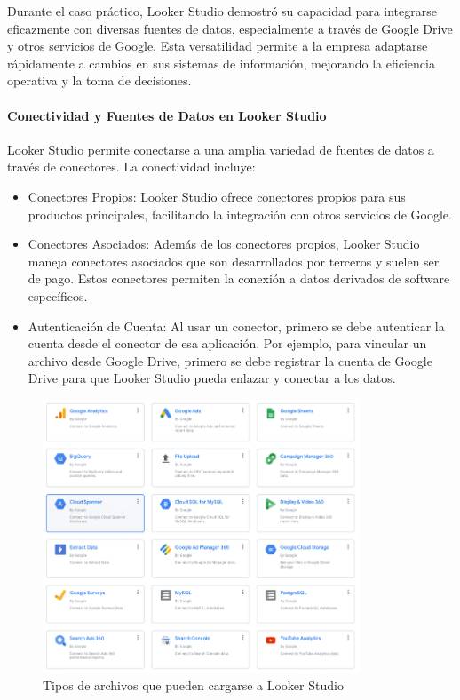 \documentclass[
  11pt,
  bookmarksnumbered]{article}
\begin{document}
Durante el caso práctico, Looker Studio demostró su capacidad para integrarse eficazmente con diversas fuentes de datos, especialmente a través de Google Drive y otros servicios de Google.
Esta versatilidad permite a la empresa adaptarse rápidamente a cambios en sus sistemas de información, mejorando la eficiencia operativa y la toma de decisiones.

\hypertarget{conectividad-y-fuentes-de-datos-en-looker-studio}{%
\paragraph{Conectividad y Fuentes de Datos en Looker Studio}\label{conectividad-y-fuentes-de-datos-en-looker-studio}}

Looker Studio permite conectarse a una amplia variedad de fuentes de datos a través de conectores.
La conectividad incluye:

\begin{itemize}
\item
  Conectores Propios: Looker Studio ofrece conectores propios para sus productos principales, facilitando la integración con otros servicios de Google.
\item
  Conectores Asociados: Además de los conectores propios, Looker Studio maneja conectores asociados que son desarrollados por terceros y suelen ser de pago.
  Estos conectores permiten la conexión a datos derivados de software específicos.
\item
  Autenticación de Cuenta: Al usar un conector, primero se debe autenticar la cuenta desde el conector de esa aplicación.
  Por ejemplo, para vincular un archivo desde Google Drive, primero se debe registrar la cuenta de Google Drive para que Looker Studio pueda enlazar y conectar a los datos.
\end{itemize}

\begin{figure}

{\centering \includegraphics[width=3.72in]{media 2/image8} 

}

\caption{Tipos de archivos que pueden cargarse a Looker Studio}\label{fig:unnamed-chunk-12}
\end{figure}
\end{document}

